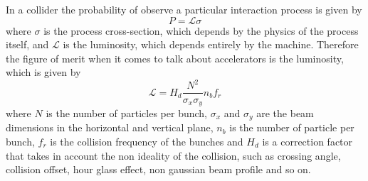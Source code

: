 In a collider the probability of observe a particular interaction process is given by
\[
P = \mathscr{L} \sigma
\]
where $\sigma$ is the process cross-section, which depends by the physics of the process itself, and $\mathscr{L}$ is the luminosity, which depends entirely by the machine.
Therefore the figure of merit when it comes to talk about accelerators is the luminosity, which is given by
\[
\mathscr{L} = H_d \frac{N^2}{\sigma_x \sigma_y} n_b f_r
\]
where $N$ is the number of particles per bunch, $\sigma_x$ and $\sigma_y$ are the beam dimensions in the horizontal and vertical plane, $n_b$ is the number of particle per bunch, $f_r$ is the collision frequency of the bunches and $H_d$ is a correction factor that takes in account the non ideality of the collision, such as crossing angle, collision offset, hour glass effect, non gaussian beam profile and so on.

